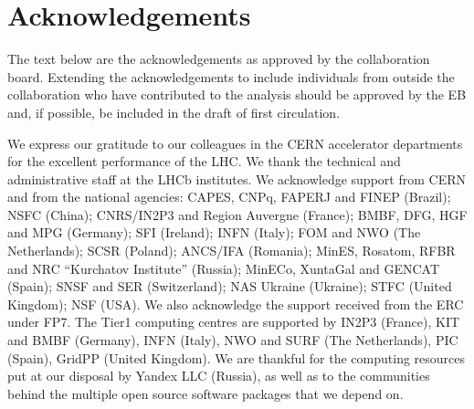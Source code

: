 \section*{Acknowledgements}

The text below are the acknowledgements as approved by the collaboration
board. Extending the acknowledgements to include individuals from outside the
collaboration who have contributed to the analysis should be approved by the
EB and, if possible, be included in the draft of first circulation.
 
\noindent We express our gratitude to our colleagues in the CERN
accelerator departments for the excellent performance of the LHC. We
thank the technical and administrative staff at the LHCb
institutes. We acknowledge support from CERN and from the national
agencies: CAPES, CNPq, FAPERJ and FINEP (Brazil); NSFC (China);
CNRS/IN2P3 and Region Auvergne (France); BMBF, DFG, HGF and MPG
(Germany); SFI (Ireland); INFN (Italy); FOM and NWO (The Netherlands);
SCSR (Poland); ANCS/IFA (Romania); MinES, Rosatom, RFBR and NRC
``Kurchatov Institute'' (Russia); MinECo, XuntaGal and GENCAT (Spain);
SNSF and SER (Switzerland); NAS Ukraine (Ukraine); STFC (United
Kingdom); NSF (USA). We also acknowledge the support received from the
ERC under FP7. The Tier1 computing centres are supported by IN2P3
(France), KIT and BMBF (Germany), INFN (Italy), NWO and SURF (The
Netherlands), PIC (Spain), GridPP (United Kingdom). We are thankful
for the computing resources put at our disposal by Yandex LLC
(Russia), as well as to the communities behind the multiple open
source software packages that we depend on.
